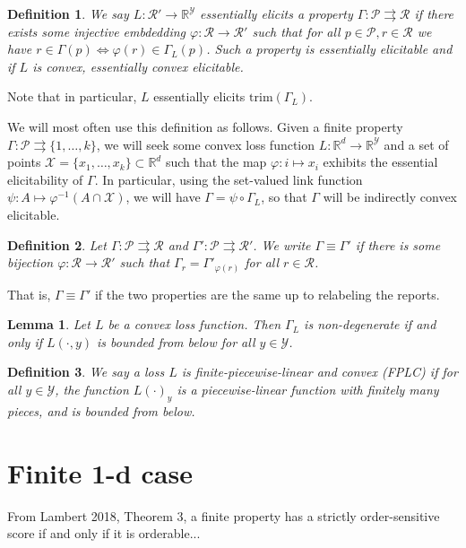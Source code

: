 \documentclass[11pt]{article}
\newcommand{\reals}{\mathbb{R}}
\renewcommand{\P}{\mathcal{P}}
\newcommand{\R}{\mathcal{R}}
\newcommand{\X}{\mathcal{X}}
\newcommand{\Y}{\mathcal{Y}}
\renewcommand{\P}{\mathcal{P}}
\newcommand{\toto}{\rightrightarrows}
\newcommand{\trim}{\mathrm{trim}}
\newtheorem{lemma}{Lemma}
\newtheorem{definition}{Definition}
\begin{document}
\begin{definition}
  We say $L:\R'\to\reals^\Y$ \emph{essentially elicits} a property $\Gamma : \P \toto \R$ if there exists some injective embdedding $\varphi:\R\to\R'$ such that for all $p\in\P,r\in\R$ we have $r \in \Gamma(p) \iff \varphi(r) \in \Gamma_L(p)$.
  Such a property is \emph{essentially elicitable} and if $L$ is convex, \emph{essentially convex elicitable}.
\end{definition}
Note that in particular, $L$ essentially elicits $\trim(\Gamma_L)$.

We will most often use this definition as follows.
Given a finite property $\Gamma : \P \toto \{1,\ldots,k\}$, we will seek some convex loss function $L : \reals^d \to \reals^\Y$ and a set of points $\X=\{x_1,\ldots,x_k\} \subset \reals^d$ such that the map $\varphi:i\mapsto x_i$ exhibits the essential elicitability of $\Gamma$.
In particular, using the set-valued link function $\psi:A\mapsto \varphi^{-1}(A\cap\X)$, we will have $\Gamma = \psi \circ \Gamma_L$, so that $\Gamma$ will be indirectly convex elicitable.

\begin{definition}
  Let $\Gamma:\P\toto\R$ and $\Gamma':\P\toto\R'$.
  We write $\Gamma \equiv \Gamma'$ if there is some bijection $\varphi:\R\to\R'$ such that $\Gamma_r = \Gamma'_{\varphi(r)}$ for all $r\in\R$.
\end{definition}
That is, $\Gamma\equiv\Gamma'$ if the two properties are the same up to relabeling the reports.

\begin{lemma}
  Let $L$ be a convex loss function.
  Then $\Gamma_L$ is non-degenerate if and only if $L(\cdot,y)$ is bounded from below for all $y\in\Y$.
\end{lemma}

\begin{definition}
  We say a loss $L$ is \emph{finite-piecewise-linear and convex (FPLC)} if for all $y\in\Y$, the function $L(\cdot)_y$ is a piecewise-linear function with finitely many pieces, and is bounded from below.
\end{definition}

\section{Finite 1-d case}

From Lambert 2018, Theorem 3, a finite property has a strictly order-sensitive score if and only if it is orderable...
\end{document}
